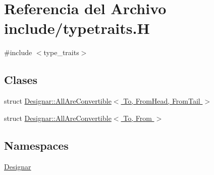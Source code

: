 \hypertarget{typetraits_8_h}{}\section{Referencia del Archivo include/typetraits.H}
\label{typetraits_8_h}
{\ttfamily \#include $<$type\+\_\+traits$>$}\newline
\subsection*{Clases}
\begin{DoxyCompactItemize}
\item 
struct \hyperlink{struct_designar_1_1_all_are_convertible}{Designar\+::\+All\+Are\+Convertible$<$ To, From\+Head, From\+Tail $>$}
\item 
struct \hyperlink{struct_designar_1_1_all_are_convertible_3_01_to_00_01_from_01_4}{Designar\+::\+All\+Are\+Convertible$<$ To, From $>$}
\end{DoxyCompactItemize}
\subsection*{Namespaces}
\begin{DoxyCompactItemize}
\item 
 \hyperlink{namespace_designar}{Designar}
\end{DoxyCompactItemize}
